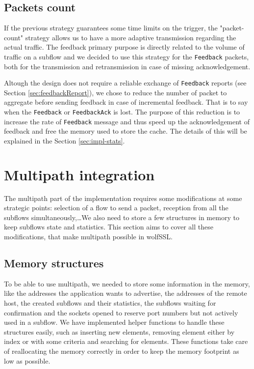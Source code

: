 \subsection{Packets count}

If the previous strategy guarantees some time limits on the trigger, the "packet-count" strategy allows us to have a more adaptive transmission regarding the actual traffic. The feedback primary purpose is directly related to the volume of traffic on a subflow and we decided to use this strategy for the \texttt{Feedback} packets, both for the transmission and retransmission in case of missing acknowledgement.

Altough the design does not require a reliable exchange of \texttt{Feedback} reports (see Section \ref{sec:feedbackReport}), we chose to reduce the number of packet to aggregate before sending feedback in case of incremental feedback. That is to say when the \texttt{Feedback} or \texttt{FeedbackAck} is lost. The purpose of this reduction is to increase the rate of \texttt{Feedback} message and thus speed up the acknowledgement of feedback and free the memory used to store the cache. The details of this will be explained in the Section \ref{sec:impl-stats}.

\section{Multipath integration}

The multipath part of the implementation requires some modifications at some strategic points: selection of a flow to send a packet, reception from all the subflows simultaneously,\dots We also need to store a few structures in memory to keep subflows state and statistics. This section aims to cover all these modifications, that make multipath possible in wolfSSL.

\subsection{Memory structures}

To be able to use multipath, we needed to store some information in the memory, like the addresses the application wants to advertise, the addresses of the remote host, the created subflows and their statistics, the subflows waiting for confirmation and the sockets opened to reserve port numbers but not actively used in a subflow. We have implemented helper functions to handle these structures easily, such as inserting new elements, removing element either by index or with some criteria and searching for elements. These functions take care of reallocating the memory correctly in order to keep the memory footprint as low as possible.

